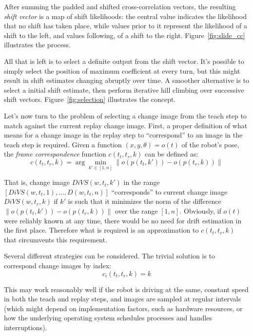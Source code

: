 \documentclass[twocolumn, 9pt,fleqn]{jsproceedings}
\begin{document}
After summing the padded and shifted cross-correlation vectors, the resulting \textit{shift vector} is a map of shift likelihoods: the central value indicates the likelihood that no shift has taken place, while values prior to it represent the likelihood of a shift to the left, and values following, of a shift to the right. Figure~\ref{fig:slide_cc} illustrates the process.

All that is left is to select a definite output from the shift vector. It's possible to simply select the position of maximum coefficient at every turn, but this might result in shift estimates changing abruptly over time. A smoother alternative is to select a initial shift estimate, then perform iterative hill climbing over successive shift vectors. Figure~\ref{fig:selection} illustrates the concept.

Let's now turn to the problem of selecting a change image from the teach step to match against the current replay change image. First, a proper definition of what means for a change image in the replay step to ``correspond'' to an image in the teach step is required. Given a function $(x, y, \theta) = o(t)$ of the robot's pose, the \textit{frame correspondence} function $c(t_t, t_r, k)$ can be defined as:
\begin{equation}
c(t_t, t_r, k) = \arg \min_{k' \in [1, n]} {\| o(p(t_t, k')) - o(p(t_r, k)) \|}
\end{equation}

That is, change image $DiVS(w, t_t, k')$ in the range $[DiVS(w, t_t, 1), \dotsc, D(w, t_t, n)]$ ``corresponds'' to current change image $DiVS(w, t_r, k)$ if $k'$ is such that it minimizes the norm of the difference $\| o(p(t_t, k')) - o(p(t_r, k)) \|$ over the range $[1, n]$. Obviously, if $o(t)$ were reliably known at any time, there would be no need for drift estimation in the first place. Therefore what is required is an approximation to $c(t_t, t_r, k)$ that circumvents this requirement.

Several different strategies can be considered. The trivial solution is to correspond change images by index:
\begin{equation}
c_i(t_t, t_r, k) = k
\end{equation}

This may work reasonably well if the robot is driving at the same, constant speed in both the teach and replay steps, and images are sampled at regular intervals (which might depend on implementation factors, such as hardware resources, or how the underlying operating system schedules processes and handles interruptions).
\end{document}
